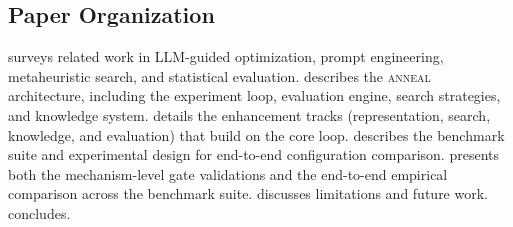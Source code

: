 \subsection{Paper Organization}

 surveys related work in LLM-guided optimization, prompt engineering, metaheuristic search, and statistical evaluation.
 describes the \textsc{anneal} architecture, including the experiment loop, evaluation engine, search strategies, and knowledge system.
 details the enhancement tracks (representation, search, knowledge, and evaluation) that build on the core loop.
 describes the benchmark suite and experimental design for end-to-end configuration comparison.
 presents both the mechanism-level gate validations and the end-to-end empirical comparison across the benchmark suite.
 discusses limitations and future work.
 concludes.
